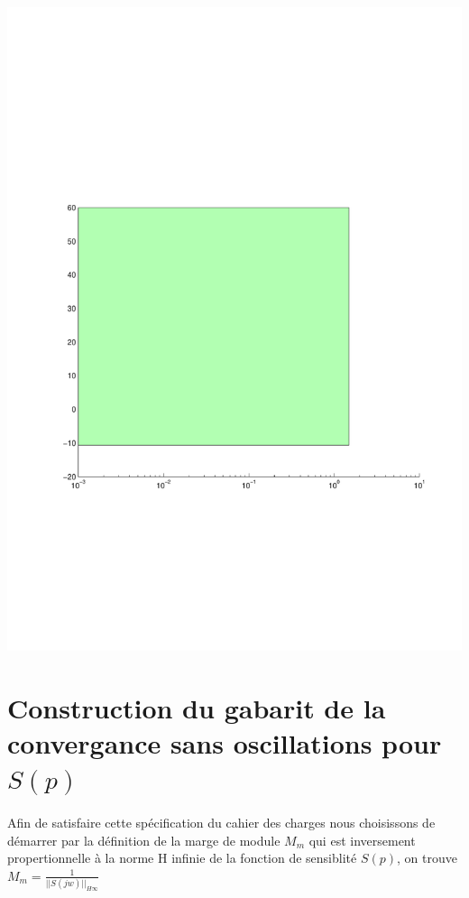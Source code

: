 \documentclass[12pt, a4paper, openany]{report}
\begin{document}
  \begin{center}
    \includegraphics[scale=0.5]{gabarit2.pdf}
    \label{fig6}
  \end{center}
  
 \section{Construction du gabarit de la convergance sans oscillations pour $S(p)$} 
  
  \paragraph{}
  Afin de satisfaire cette spécification du cahier des charges nous choisissons de démarrer par la définition de la marge de module $M_{m} $ qui est inversement propertionnelle à la norme H infinie de la fonction de sensiblité $S(p) $, on trouve $M_{m}=\frac{1}{||S(jw)||_{H\infty}} $ 
  
\end{document}
